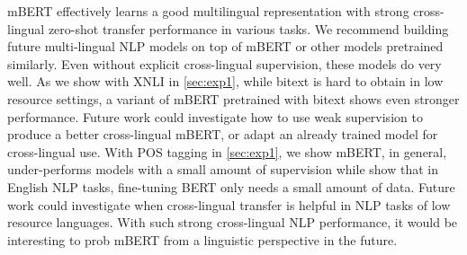 \documentclass[11pt,a4paper]{article}
\begin{document}
mBERT effectively learns a good multilingual representation with strong cross-lingual zero-shot transfer performance in various tasks. We recommend building future multi-lingual NLP models on top of mBERT or other models pretrained similarly. Even without explicit cross-lingual supervision, these models do very well. As we show with XNLI in \cref{sec:exp1}, while bitext is hard to obtain in low resource settings, a variant of mBERT pretrained with bitext \cite{lample2019cross} shows even stronger performance. Future work could investigate how to use weak supervision to produce a better cross-lingual mBERT, or adapt an already trained model for cross-lingual use. With POS tagging in \cref{sec:exp1}, we show mBERT, in general, under-performs models with a small amount of supervision while \citet{devlin-etal-2019-bert} show that in English NLP tasks, fine-tuning BERT only needs a small amount of data. Future work could investigate when cross-lingual transfer is helpful in NLP tasks of low resource languages. With such strong cross-lingual NLP performance, it would be interesting to prob mBERT from a linguistic perspective in the future.








\cleardoublepage
\appendix
\end{document}
